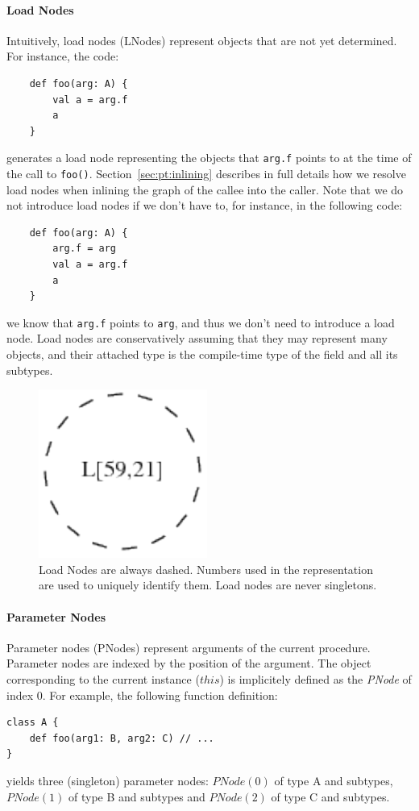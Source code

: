 \paragraph{Load Nodes}
Intuitively, load nodes (LNodes) represent objects that are not yet determined.
For instance, the code:
\begin{lstlisting}
    def foo(arg: A) {
        val a = arg.f
        a
    }
\end{lstlisting}
generates a load node representing the objects that \verb/arg.f/ points to
at the time of the call to \verb/foo()/. Section~\ref{sec:pt:inlining}
describes in full details how we resolve load nodes when inlining the graph of
the callee into the caller. Note that we do not introduce load nodes if we
don't have to, for instance, in the following code:
\begin{lstlisting}
    def foo(arg: A) {
        arg.f = arg
        val a = arg.f
        a
    }
\end{lstlisting}
we know that \verb/arg.f/ points to \verb/arg/, and thus we don't need to
introduce a load node. Load nodes are conservatively assuming that they may
represent many objects, and their attached type is the compile-time type of the
field and all its subtypes.

\begin{figure}[h]
    \centering

    \includegraphics{images/pt_lnodes}

    \caption{Load Nodes are always dashed. Numbers used in the representation
    are used to uniquely identify them. Load nodes are never singletons.}
    \label{fig:pt:lnodes}
\end{figure}

\paragraph{Parameter Nodes} Parameter nodes (PNodes) represent arguments of the current
procedure. Parameter nodes are indexed by the position of the argument. The object
corresponding to the current instance ($this$) is implicitely defined as the
\emph{PNode} of index 0. For example, the following function definition:
\begin{lstlisting}
class A {
    def foo(arg1: B, arg2: C) // ...
}
\end{lstlisting}
yields three (singleton) parameter nodes: $PNode(0)$ of type A and
subtypes, $PNode(1)$ of type B and subtypes and $PNode(2)$ of type C and
subtypes.


